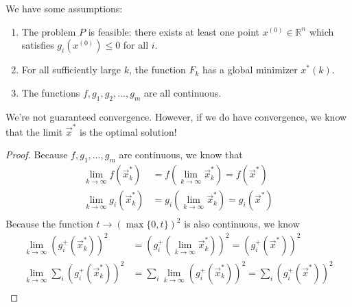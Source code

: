 \documentclass[11pt,a4paper]{article}
\newtheorem{theorem}{Theorem}
\begin{document}
We have some assumptions:
\begin{enumerate}[$(1)$]
    \item The problem $P$ is feasible: there exists at least one point $x^{(0)} \in \mathbb{R}^n$ which satisfies $g_i(x^{(0)}) \leq 0$ for all $i$.
    \item For all sufficiently large $k$, the function $F_k$ has a global minimizer $x^*(k)$.
    \item The functions $f,g_1,g_2,...,g_m$ are all continuous.
\end{enumerate}
We're not guaranteed convergence. However, if we do have convergence, we know that the limit $\vec{x}^*$ is the optimal solution!
\begin{center}
\end{center}
\begin{proof}
Because $f,g_1,...,g_m$ are continuous, we know that
\begin{equation}
    \begin{aligned}
        \lim_{k \rightarrow \infty}f(\vec{x}_k^*)&=f(\lim_{k \rightarrow \infty}\vec{x}_k^*)=f(\vec{x}^*)\\
        \lim_{k \rightarrow \infty}g_i(\vec{x}_k^*)&=g_i(\lim_{k \rightarrow \infty}\vec{x}_k^*)=g_i(\vec{x}^*)\\
    \end{aligned}
    \nonumber
\end{equation}
Because the function $t \rightarrow \left(\max\{0,t\}\right)^2$ is also continuous, we know
\begin{equation}
    \begin{aligned}
        \lim_{k \rightarrow \infty}\left(g_i^+(\vec{x}_k^*)\right)^2&=\left(g^+_i(\lim_{k \rightarrow \infty}\vec{x}_k^*)\right)^2=\left(g^+_i(\vec{x}^*)\right)^2\\
        \lim_{k \rightarrow \infty}\sum_{i}\left(g_i^+(\vec{x}_k^*)\right)^2&=\sum_{i}\lim_{k \rightarrow \infty}\left(g_i^+(\vec{x}_k^*)\right)^2=\sum_{i}\left(g^+_i(\vec{x}^*)\right)^2\\
    \end{aligned}
    \nonumber
\end{equation}
\end{proof}
\end{document}
